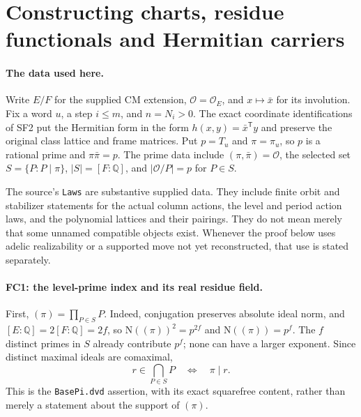 \section{Constructing charts, residue functionals and Hermitian carriers}
\label{sec:global-forms}


\paragraph{The data used here.}
Write $E/F$ for the supplied CM extension, $\mathcal O=\mathcal O_E$,
and $x\mapsto\bar x$ for its involution. Fix a word $u$, a step $i\le m$,
and $n=N_i>0$. The exact coordinate identifications of SF2 put the
Hermitian form in the form $h(x,y)=\bar x^{\mathsf T}y$ and preserve the
original class lattice and frame matrices. Put $p=T_u$ and
$\pi=\pi_u$, so $p$ is a rational prime and
$\pi\bar\pi=p$. The prime data include
$(\pi,\bar\pi)=\mathcal O$, the selected set
$S=\{P:P\mid\pi\}$, $|S|=[F:\mathbb Q]$, and
$|\mathcal O/P|=p$ for $P\in S$.

The source's \texttt{Laws} are substantive supplied data. They include
finite orbit and stabilizer statements for the actual column actions,
the level and period action laws, and the polynomial lattices and their
pairings. They do not mean merely that some unnamed compatible objects
exist. Whenever the proof below uses adelic realizability or a supported
move not yet reconstructed, that use is stated separately.

\paragraph{FC1: the level-prime index and its real residue field.}
First, $(\pi)=\prod_{P\in S}P$. Indeed, conjugation preserves absolute
ideal norm, and $[E:\mathbb Q]=2[F:\mathbb Q]=2f$, so
$\mathrm N((\pi))^2=p^{2f}$ and $\mathrm N((\pi))=p^f$.
The $f$ distinct primes in $S$ already contribute $p^f$; none can have
a larger exponent. Since distinct maximal ideals are comaximal,
\[
 r\in\bigcap_{P\in S}P\quad\Longleftrightarrow\quad\pi\mid r.
 \tag{FC.1}
\]
This is the \texttt{BasePi.dvd} assertion, with its exact squarefree
content, rather than merely a statement about the support of $(\pi)$.


